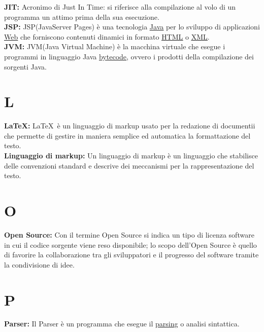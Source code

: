 \hypertarget{JIT}{}
\textbf{JIT:}
Acronimo di Just In Time: si riferisce alla compilazione al volo di un programma un attimo prima della sua esecuzione.\\

\hypertarget{jsp}{}
\textbf{JSP:}
JSP(JavaServer Pages) \`e una tecnologia \hyperlink{java}{\underline{Java}} per lo sviluppo di applicazioni \hyperlink{web}{\underline{Web}} che forniscono contenuti dinamici in formato \hyperlink{html}{\underline{HTML}} o \hyperlink{xml}{\underline{XML}}.\\

\hypertarget{jvm}{}
\textbf{JVM:}
JVM(Java Virtual Machine) \`e la macchina virtuale che esegue i programmi in linguaggio Java \hyperlink{bytecode}{\underline{bytecode}}, ovvero i prodotti della compilazione dei sorgenti Java.\\

\section*{L}
\hypertarget{latex}{}
\textbf{\LaTeX:}
\LaTeX \ \`e un linguaggio di markup usato per la redazione di documentii che permette di gestire in maniera semplice ed automatica la formattazione del testo.\\

\textbf{Linguaggio di markup:}
\hypertarget{markup}{}
Un linguaggio di markup \`e un linguaggio che stabilisce delle convenzioni standard e descrive dei meccanismi per la rappresentazione del testo.\\

\section*{O}
\hypertarget{opensource}{}
\textbf{Open Source:}
Con il termine Open Source si indica un tipo di licenza software in cui il codice sorgente viene reso disponibile; lo scopo dell'Open Source \`e quello di favorire la collaborazione tra gli sviluppatori e il progresso del software tramite la condivisione di idee.\\

\section*{P}
\hypertarget{parser}{}
\textbf{Parser:}
Il Parser \` e un programma che esegue il \hyperlink{parsing}{\underline{parsing}} o analisi sintattica.\\


